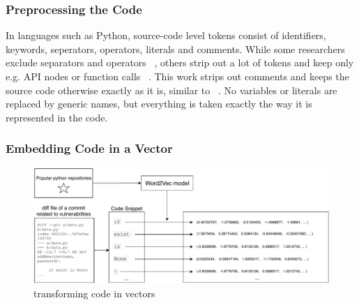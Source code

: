 \documentclass[
	a4paper,
	pagesize,
	pdftex,
	12pt,
	twoside, %
	BCOR=5mm, %
	ngerman,
	fleqn,
	final,
	]{scrartcl}
\begin{document}
\subsubsection{Preprocessing the Code}
In languages such as Python, source-code level tokens consist of identifiers, keywords, seperators, operators, literals and comments. While some researchers exclude separators and operators ~\cite{Pang.2015}, others strip out a lot of tokens and keep only e.g. API nodes or function calls ~\cite{Yamaguchi.2012}. This work strips out comments and keeps the source code otherwise exactly as it is, similar to  ~\cite{Hovsepyan.2012}. No variables or literals are replaced by generic names, but everything is taken  exactly the way it is represented in the code. 

\subsubsection{Embedding Code in a Vector}
\begin{figure}[ht]
	\centering
	\includegraphics[width=\linewidth]{img/Word2Vec}
	\caption{transforming code in vectors}
	\label{fig:word2vec}
\end{figure}
\end{document}
